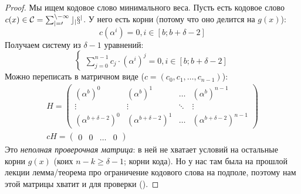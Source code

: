 \begin{proof}
	Мы ищем кодовое слово минимального веса.
	Пусть есть кодовое слово $c(x) \in \cal C=\sum_{j=0}^{n-1} c_jx^j$.
	У него есть корни (потому что оно делится на $g(x)$):
	\[
		c(\alpha^i) = 0, i \in [b; b+\delta-2]
	\]
	Получаем систему из $\delta-1$ уравнений:
	\[	
		\begin{cases}
			\sum_{j=0}^{n-1} c_j\cdot(\alpha^i)^j = 0, i \in [b; b + \delta-2]
		\end{cases}
	\]
	Можно переписать в матричном виде ($c = (c_0, c_1, \dots, c_{n-1})$):
	\begin{gather*}
		H=
		\begin{pmatrix}
			(\alpha^b)^0 & (\alpha^b)^1 & \dots & (\alpha^b)^{n-1} \\
			\vdots & \vdots & \ddots & \vdots \\
			(\alpha^{b+\delta-2})^0 & (\alpha^{b+\delta-2})^1 & \dots & (\alpha^{b+\delta-2})^{n-1}
		\end{pmatrix} \\
		cH = \begin{pmatrix}
			0 & 0 & \dots & 0
		\end{pmatrix}
	\end{gather*}
	Это \textit{неполная проверочная матрица}: в ней не хватает условий
	на остальные корни $g(x)$ (коих $n-k \ge \delta - 1$; корни кода).
	Но у нас там была на прошлой лекции лемма/теорема про ограничение
	кодового слова на подполе, поэтому нам этой матрицы хватит и для проверки
	(\TODO).


\end{proof}
